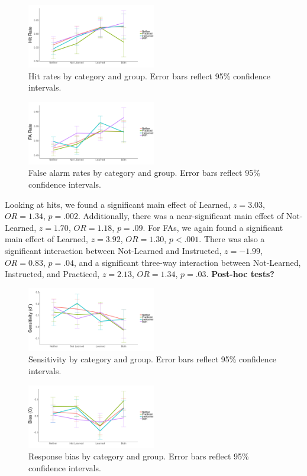 \documentclass[twocolumn]{svjour3}          %
\begin{document}
\begin{figure}
  \includegraphics[width=0.5\textwidth]{E6_hits.png}
  \caption{Hit rates by category and group. Error bars reflect 95\%
    confidence intervals.}
  \label{fig:hits}
\end{figure}
\begin{figure}
  \includegraphics[width=0.5\textwidth]{E6_FAs.png}
  \caption{False alarm rates by category and group. Error bars reflect
    95\% confidence intervals.}
  \label{fig:fas}
\end{figure}


Looking at hits, we found a significant main effect of Learned, $z =
3.03$, $OR = 1.34$, $p = .002$. Additionally, there was a
near-significant main effect of Not-Learned, $z = 1.70$, $OR = 1.18$,
$p = .09$. For FAs, we again found a significant main effect of
Learned, $z = 3.92$, $OR = 1.30$, $p < .001$. There was also a
significant interaction between Not-Learned and Instructed, $z =
-1.99$, $OR = 0.83$, $p = .04$, and a significant three-way
interaction between Not-Learned, Instructed, and Practiced, $z =
2.13$, $OR = 1.34$, $p = .03$. \textbf{Post-hoc tests?}

\begin{figure}
  \includegraphics[width=0.5\textwidth]{E6_sensitivity.png}
  \caption{Sensitivity by category and group. Error bars reflect 95\%
    confidence intervals.}
  \label{fig:sensitivity}
\end{figure}
\begin{figure}
  \includegraphics[width=0.5\textwidth]{E6_bias.png}
  \caption{Response bias by category and group. Error bars reflect
    95\% confidence intervals.}
  \label{fig:bias}
\end{figure}
\end{document}
